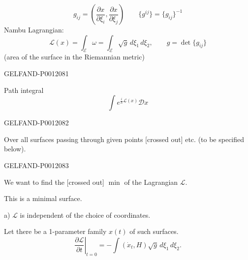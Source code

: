 \begin{equation*}
g_{ij}=\left(\frac{\partial x}{\partial\xi_i},
\frac{\partial x}{\partial\xi_j}\right)
\qquad \{g^{ij}\}=\{g_{ij}\}^{-1}
\tag{1}
\end{equation*}
Nambu Lagrangian:
\begin{equation*}
\mathcal L(x)=\int_{\mathcal E}\omega
=\int_{\mathcal E}\sqrt g\,d\xi_1\,d\xi_2,
\qquad g=\det\{g_{ij}\}
\tag{2}
\end{equation*}
(area of the surface in the Riemannian metric)


\begin{GelfandAdjacentEvidence}{GELFAND-P001208}{1}

Path integral
\begin{equation*}
\int e^{\frac{i}{h}\mathcal L(x)}\mathcal D x
\tag{3}
\end{equation*}
\end{GelfandAdjacentEvidence}
\begin{GelfandAdjacentEvidence}{GELFAND-P001208}{2}


Over all surfaces passing through given points [crossed out] etc. (to be specified below).
\end{GelfandAdjacentEvidence}
\begin{GelfandAdjacentEvidence}{GELFAND-P001208}{3}


We want to find the [crossed out] \(\min\) of the Lagrangian \(\mathcal L\).
\end{GelfandAdjacentEvidence}

This is a minimal surface.


a) \(\mathcal L\) is independent of the choice of coordinates.


Let there be a 1-parameter family \(x(t)\) of such surfaces.
\begin{equation*}
\left.\frac{\partial\mathcal L}{\partial t}\right|_{t=0}
=-\int(\dot{x}_t,H)\sqrt g\,d\xi_1\,d\xi_2.
\tag{4}
\end{equation*}

